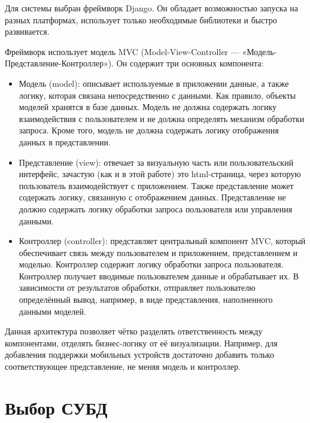 \documentclass{bmstu-gost-7-32}
\begin{document}
Для системы выбран фреймворк Django.
Он обладает возможностью запуска на разных платформах, использует только необходимые библиотеки и быстро развивается.

Фреймворк использует модель MVC (Model-View-Controller — «Модель-Представление-Контроллер»).
Он содержит три основных компонента:
\begin{itemize}
	\item Модель (model): описывает используемые в приложении данные, а также логику, которая связана непосредственно с данными.
	Как правило, объекты моделей хранятся в базе данных.
	Модель не должна содержать логику взаимодействия с пользователем и не должна определять механизм обработки запроса.
	Кроме того, модель не должна содержать логику отображения данных в представлении.

	\item Представление (view): отвечает за визуальную часть или пользовательский интерфейс, зачастую (как и в этой работе) это html-страница, через которую пользователь взаимодействует с приложением.
	Также представление может содержать логику, связанную с отображением данных.
	Представление не должно содержать логику обработки запроса пользователя или управления данными.

	\item Контроллер (controller): представляет центральный компонент MVC, который обеспечивает связь между пользователем и приложением, представлением и моделью.
	Контроллер содержит логику обработки запроса пользователя.
	Контроллер получает вводимые пользователем данные и обрабатывает их.
	В зависимости от результатов обработки, отправляет пользователю определённый вывод, например, в виде представления, наполненного данными моделей.
\end{itemize}

Данная архитектура позволяет чётко разделять ответственность между компонентами, отделять бизнес-логику от её визуализации.
Например, для добавления поддержки мобильных устройств достаточно добавить только соответствующее представление, не меняя модель и контроллер.

\section*{Выбор СУБД}
\end{document}
